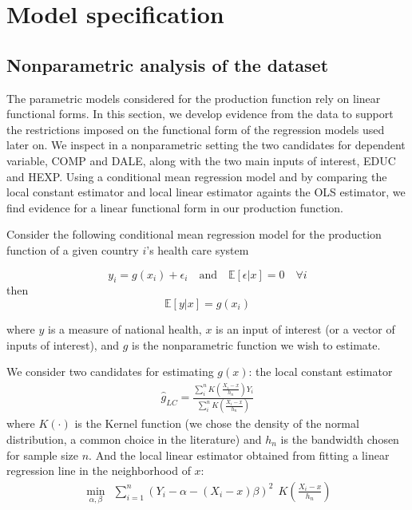 \documentclass[12pt,a4paper]{article}\usepackage[]{graphicx}\usepackage[]{color}
\begin{document}
%
%

\section{Model specification}
\subsection{Nonparametric analysis of the dataset}
The parametric models considered for the production function rely on linear functional forms. In this section, we develop evidence from the data to support the restrictions imposed on the functional form of the regression models used later on. We inspect in a nonparametric setting the two candidates for dependent variable, COMP and DALE, along with the two main inputs of interest, EDUC and HEXP. Using a conditional mean regression model and by comparing the local constant estimator and local linear estimator againts the OLS estimator, we find evidence for a linear functional form in our production function. 
 
Consider the following conditional mean regression model for the production function of a given country $i$'s health care system

$$
y_i = g(x_i) + \epsilon_i \quad \textrm{and} \quad \mathbb{E}[\epsilon|x]=0 \quad \forall i
$$
then
$$
\mathbb{E}[y|x]=g(x_i)
$$

where $y$ is a measure of national health, $x$ is an input of interest (or a vector of inputs of interest), and $g$ is the nonparametric function we wish to estimate.

We consider two candidates for estimating $g(x)$: the local constant estimator
\begin{align*}
\hat{g}_{LC} = \frac{\sum^n_i K \left( \frac{ X_i - x}{h_n} \right) Y_i}{\sum^n_i K \left( \frac{ X_i - x}{h_n} \right)}
\end{align*}
where $K(\cdot)$ is the Kernel function (we chose the density of the normal distribution, a common choice in the literature) and $h_n$ is the bandwidth chosen for sample size $n$. And the local linear estimator obtained from fitting a linear regression line in the neighborhood of $x$:
\begin{align*}
\min_{\alpha , \beta} \ \ \sum^n_{i=1} (Y_i - \alpha - (X_i - x)\beta)^2 \ \ K \left( \frac{ X_i - x}{h_n} \right)
\end{align*}
\end{document}
